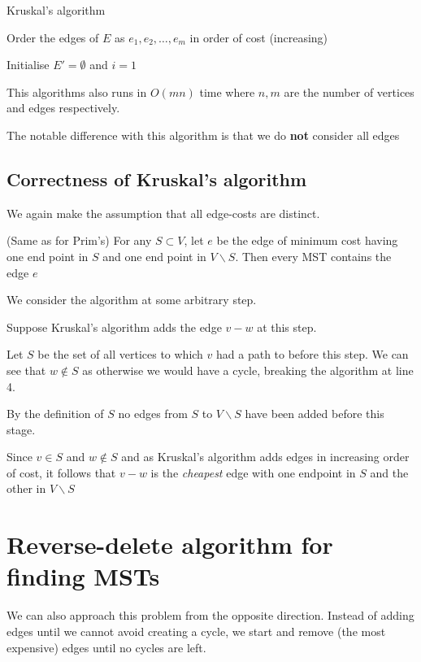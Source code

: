 \documentclass{article}
\begin{document}
\begin{algorithm}
  \caption{Kruskal's algorithm}
  Order the edges of $E$ as $e_{1},e_{2},\ldots,e_{m}$ in order of cost (increasing)

  Initialise $E' = \emptyset$ and $i=1$

\end{algorithm}

This algorithms also runs in $O(mn)$ time where $n,m$ are the number of vertices and edges respectively.

The notable difference with this algorithm is that we do \textbf{not} consider all edges

\subsection{Correctness of Kruskal's algorithm}

We again make the assumption that all edge-costs are distinct.

\begin{theorem}(Same as for Prim's)
  For any $S \subset V$, let $e$ be the edge of minimum cost having one end point in $S$ and one end point in $V \backslash S$. Then every MST contains the edge $e$
\end{theorem}

We consider the algorithm at some arbitrary step.

Suppose Kruskal's algorithm adds the edge $v - w$ at this step.

Let $S$ be the set of all vertices to which $v$ had a path to before this step. We can see that $w \notin S$ as otherwise we would have a cycle, breaking the algorithm at line 4.

By the definition of $S$ no edges from $S$ to $V \backslash S$ have been added before this stage.

Since $v \in S$ and $w \notin S$ and as Kruskal's algorithm adds edges in increasing order of cost, it follows that $v - w$ is the \textit{cheapest} edge with one endpoint in $S$ and the other in $V \backslash S$

\section{Reverse-delete algorithm for finding MSTs}

We can also approach this problem from the opposite direction. Instead of adding edges until we cannot avoid creating a cycle, we start and remove (the most expensive) edges until no cycles are left.
\end{document}
